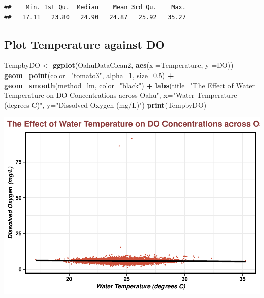 \documentclass[12pt,]{article}
\newenvironment{Shaded}{\begin{snugshade}}{\end{snugshade}}
\newcommand{\KeywordTok}[1]{\textcolor[rgb]{0.13,0.29,0.53}{\textbf{#1}}}
\newcommand{\DataTypeTok}[1]{\textcolor[rgb]{0.13,0.29,0.53}{#1}}
\newcommand{\DecValTok}[1]{\textcolor[rgb]{0.00,0.00,0.81}{#1}}
\newcommand{\FloatTok}[1]{\textcolor[rgb]{0.00,0.00,0.81}{#1}}
\newcommand{\StringTok}[1]{\textcolor[rgb]{0.31,0.60,0.02}{#1}}
\newcommand{\OperatorTok}[1]{\textcolor[rgb]{0.81,0.36,0.00}{\textbf{#1}}}
\newcommand{\NormalTok}[1]{#1}
\begin{document}
\begin{Shaded}
\end{Shaded}

\begin{verbatim}
##    Min. 1st Qu.  Median    Mean 3rd Qu.    Max. 
##   17.11   23.80   24.90   24.87   25.92   35.27
\end{verbatim}

\subsection{Plot Temperature against
DO}\label{plot-temperature-against-do}

\begin{Shaded}
\begin{Highlighting}[]
\NormalTok{TempbyDO <-}\StringTok{ }
\StringTok{  }\KeywordTok{ggplot}\NormalTok{(OahuDataClean2, }\KeywordTok{aes}\NormalTok{(}\DataTypeTok{x =}\NormalTok{Temperature, }\DataTypeTok{y =}\NormalTok{DO)) }\OperatorTok{+}
\StringTok{  }\KeywordTok{geom_point}\NormalTok{(}\DataTypeTok{color=}\StringTok{"tomato3"}\NormalTok{, }\DataTypeTok{alpha=}\DecValTok{1}\NormalTok{, }\DataTypeTok{size=}\FloatTok{0.5}\NormalTok{) }\OperatorTok{+}
\StringTok{  }\KeywordTok{geom_smooth}\NormalTok{(}\DataTypeTok{method=}\NormalTok{lm, }\DataTypeTok{color=}\StringTok{"black"}\NormalTok{) }\OperatorTok{+}
\StringTok{  }\KeywordTok{labs}\NormalTok{(}\DataTypeTok{title=}\StringTok{"The Effect of Water Temperature on DO Concentrations across Oahu"}\NormalTok{, }\DataTypeTok{x=}\StringTok{"Water Temperature (degrees C)"}\NormalTok{, }\DataTypeTok{y=}\StringTok{"Dissolved Oxygen (mg/L)"}\NormalTok{)}
\KeywordTok{print}\NormalTok{(TempbyDO) }
\end{Highlighting}
\end{Shaded}

\includegraphics{Garcia_ENV872_Project_files/figure-latex/unnamed-chunk-26-1.pdf}
\end{document}
